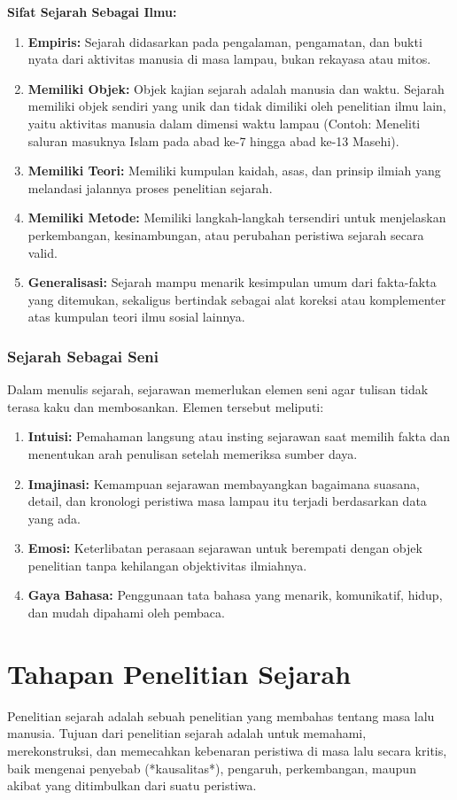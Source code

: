 \documentclass[12pt, a4paper]{article}
\begin{document}
\noindent \textbf{Sifat Sejarah Sebagai Ilmu:}
\begin{enumerate}
	\item \textbf{Empiris:} Sejarah didasarkan pada pengalaman, pengamatan, dan bukti nyata dari aktivitas manusia di masa lampau, bukan rekayasa atau mitos.
	\item \textbf{Memiliki Objek:} Objek kajian sejarah adalah manusia dan waktu. Sejarah memiliki objek sendiri yang unik dan tidak dimiliki oleh penelitian ilmu lain, yaitu aktivitas manusia dalam dimensi waktu lampau (Contoh: Meneliti saluran masuknya Islam pada abad ke-7 hingga abad ke-13 Masehi).
	\item \textbf{Memiliki Teori:} Memiliki kumpulan kaidah, asas, dan prinsip ilmiah yang melandasi jalannya proses penelitian sejarah.
	\item \textbf{Memiliki Metode:} Memiliki langkah-langkah tersendiri untuk menjelaskan perkembangan, kesinambungan, atau perubahan peristiwa sejarah secara valid.
	\item \textbf{Generalisasi:} Sejarah mampu menarik kesimpulan umum dari fakta-fakta yang ditemukan, sekaligus bertindak sebagai alat koreksi atau komplementer atas kumpulan teori ilmu sosial lainnya.
\end{enumerate}

\subsubsection{Sejarah Sebagai Seni}
Dalam menulis sejarah, sejarawan memerlukan elemen seni agar tulisan tidak terasa kaku dan membosankan. Elemen tersebut meliputi:
\begin{enumerate}
	\item \textbf{Intuisi:} Pemahaman langsung atau insting sejarawan saat memilih fakta dan menentukan arah penulisan setelah memeriksa sumber daya.
	\item \textbf{Imajinasi:} Kemampuan sejarawan membayangkan bagaimana suasana, detail, dan kronologi peristiwa masa lampau itu terjadi berdasarkan data yang ada.
	\item \textbf{Emosi:} Keterlibatan perasaan sejarawan untuk berempati dengan objek penelitian tanpa kehilangan objektivitas ilmiahnya.
	\item \textbf{Gaya Bahasa:} Penggunaan tata bahasa yang menarik, komunikatif, hidup, dan mudah dipahami oleh pembaca.
\end{enumerate}

\section{Tahapan Penelitian Sejarah}
Penelitian sejarah adalah sebuah penelitian yang membahas tentang masa lalu manusia. Tujuan dari penelitian sejarah adalah untuk memahami, merekonstruksi, dan memecahkan kebenaran peristiwa di masa lalu secara kritis, baik mengenai penyebab (*kausalitas*), pengaruh, perkembangan, maupun akibat yang ditimbulkan dari suatu peristiwa.
\end{document}
